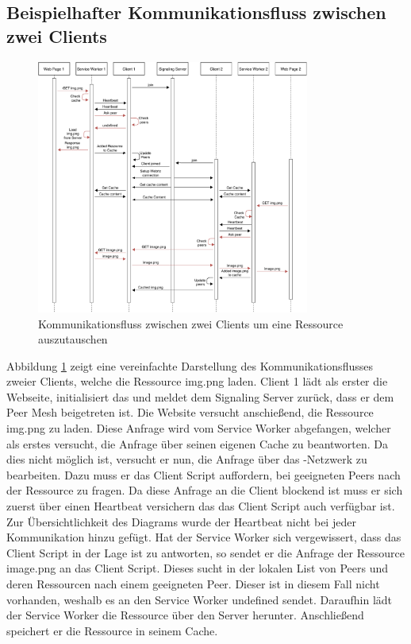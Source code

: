 \begin{description}
\subsection{Beispielhafter Kommunikationsfluss zwischen zwei Clients}
\begin{figure}[!h]
	\centering
	\includegraphics[width=0.8\textwidth]{figures/message_flow_cdn}
	\caption[A Figure Short-Title]{Kommunikationsfluss zwischen zwei Clients um eine Ressource auszutauschen}
	\label{fig:message_flow_cdn}
\end{figure}

Abbildung \ref{fig:message_flow_cdn} zeigt eine vereinfachte Darstellung des Kommunikationsflusses zweier Clients, welche die Ressource img.png laden. Client 1 lädt als erster die Webseite, initialisiert das \cdn und meldet dem Signaling Server zurück, dass er dem Peer Mesh beigetreten ist. Die Website versucht anschießend, die Ressource img.png zu laden. Diese Anfrage wird vom Service Worker abgefangen, welcher als erstes versucht, die Anfrage über seinen eigenen Cache zu beantworten. Da dies nicht möglich ist, versucht er nun, die Anfrage über das \pTp-Netzwerk zu bearbeiten. Dazu muss er das Client Script auffordern, bei geeigneten Peers nach der Ressource zu fragen. Da diese Anfrage an die Client blockend ist muss er sich zuerst über einen Heartbeat versichern das das Client Script auch verfügbar ist. Zur Übersichtlichkeit des Diagrams wurde der Heartbeat nicht bei jeder Kommunikation hinzu gefügt. Hat der Service Worker sich vergewissert, dass das Client Script in der Lage ist zu antworten, so sendet er die Anfrage der Ressource image.png an das Client Script. Dieses sucht in der lokalen List von Peers und deren Ressourcen nach einem geeigneten Peer. Dieser ist in diesem Fall nicht vorhanden, weshalb es an den Service Worker undefined sendet. Daraufhin lädt der Service Worker die Ressource über den Server herunter. Anschließend speichert er die Ressource in seinem Cache.


\end{description}
